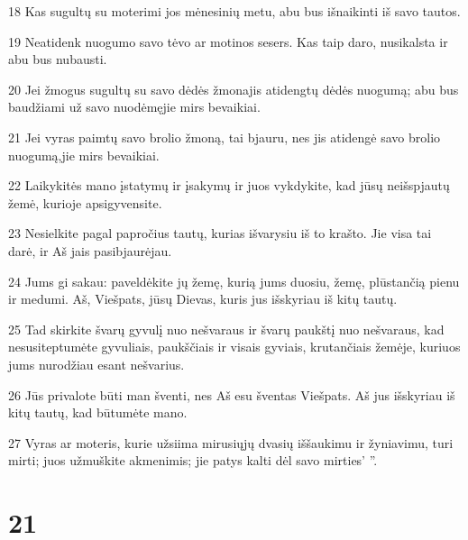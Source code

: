 \par 18 Kas sugultų su moterimi jos mėnesinių metu, abu bus išnaikinti iš savo tautos. 
\par 19 Neatidenk nuogumo savo tėvo ar motinos sesers. Kas taip daro, nusikalsta ir abu bus nubausti. 
\par 20 Jei žmogus sugultų su savo dėdės žmona­jis atidengtų dėdės nuogumą; abu bus baudžiami už savo nuodėmę­jie mirs bevaikiai. 
\par 21 Jei vyras paimtų savo brolio žmoną, tai bjauru, nes jis atidengė savo brolio nuogumą,­jie mirs bevaikiai. 
\par 22 Laikykitės mano įstatymų ir įsakymų ir juos vykdykite, kad jūsų neišspjautų žemė, kurioje apsigyvensite. 
\par 23 Nesielkite pagal papročius tautų, kurias išvarysiu iš to krašto. Jie visa tai darė, ir Aš jais pasibjaurėjau. 
\par 24 Jums gi sakau: paveldėkite jų žemę, kurią jums duosiu, žemę, plūstančią pienu ir medumi. Aš, Viešpats, jūsų Dievas, kuris jus išskyriau iš kitų tautų. 
\par 25 Tad skirkite švarų gyvulį nuo nešvaraus ir švarų paukštį nuo nešvaraus, kad nesusiteptumėte gyvuliais, paukščiais ir visais gyviais, krutančiais žemėje, kuriuos jums nurodžiau esant nešvarius. 
\par 26 Jūs privalote būti man šventi, nes Aš esu šventas Viešpats. Aš jus išskyriau iš kitų tautų, kad būtumėte mano. 
\par 27 Vyras ar moteris, kurie užsiima mirusiųjų dvasių iššaukimu ir žyniavimu, turi mirti; juos užmuškite akmenimis; jie patys kalti dėl savo mirties’ ”.



\chapter{21}


